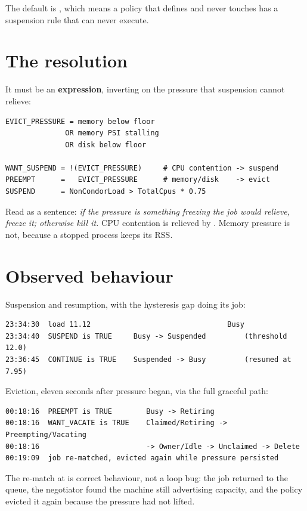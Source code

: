 The default is , which means a policy that defines  and
never touches  has a suspension rule that can never execute.

\section{The resolution}

It must be an \textbf{expression}, inverting on the pressure that suspension
cannot relieve:

\begin{lstlisting}
EVICT_PRESSURE = memory below floor
              OR memory PSI stalling
              OR disk below floor

WANT_SUSPEND = !(EVICT_PRESSURE)     # CPU contention -> suspend
PREEMPT      =   EVICT_PRESSURE      # memory/disk    -> evict
SUSPEND      = NonCondorLoad > TotalCpus * 0.75
\end{lstlisting}

Read as a sentence: \emph{if the pressure is something freezing the job would
relieve, freeze it; otherwise kill it.} CPU contention is relieved by
. Memory pressure is not, because a stopped process keeps its RSS.

\section{Observed behaviour}

Suspension and resumption, with the hysteresis gap doing its job:

\begin{lstlisting}[style=term]
23:34:30  load 11.12                                Busy
23:34:40  SUSPEND is TRUE     Busy -> Suspended         (threshold 12.0)
23:36:45  CONTINUE is TRUE    Suspended -> Busy         (resumed at 7.95)
\end{lstlisting}

Eviction, eleven seconds after pressure began, via the full graceful path:

\begin{lstlisting}[style=term]
00:18:16  PREEMPT is TRUE        Busy -> Retiring
00:18:16  WANT_VACATE is TRUE    Claimed/Retiring -> Preempting/Vacating
00:18:16                         -> Owner/Idle -> Unclaimed -> Delete
00:19:09  job re-matched, evicted again while pressure persisted
\end{lstlisting}

The re-match at  is correct behaviour, not a loop bug: the job
returned to the queue, the negotiator found the machine still advertising
capacity, and the policy evicted it again because the pressure had not lifted.

